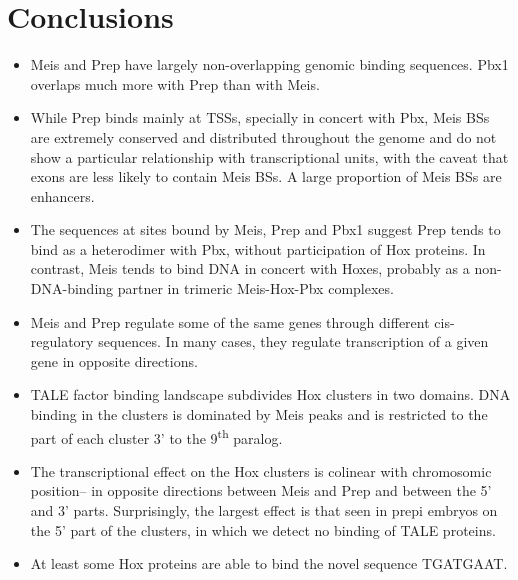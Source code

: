 \chapter{Conclusions}
\label{chp:conclusions}

\begin{itemize}

  \item Meis and Prep have largely non-overlapping genomic binding sequences. Pbx1 overlaps much more with Prep than with Meis. 
  
  \item While Prep binds mainly at \acp{TSS}, specially in concert with Pbx, Meis \acp{BS} are extremely conserved and distributed throughout the genome and do not show a particular relationship with transcriptional units, with the caveat that exons are less likely to contain Meis \acp{BS}. A large proportion of Meis \acp{BS} are enhancers. 
  
  \item The sequences at sites bound by Meis, Prep and Pbx1 suggest Prep tends to bind as a heterodimer with Pbx, without participation of Hox proteins. In contrast, Meis tends to bind DNA in concert with Hoxes, probably as a non-DNA-binding partner in trimeric Meis-Hox-Pbx complexes.
    
  \item Meis and Prep regulate some of the same genes through different cis-regulatory sequences. In many cases, they regulate transcription of a given gene in opposite directions.  
  
  \item TALE factor binding landscape subdivides Hox clusters in two domains. DNA binding in the clusters is dominated by Meis peaks and is restricted to the part of each cluster 3' to the 9\textsuperscript{th} paralog.
  
  \item The transcriptional effect on the Hox clusters is colinear with chromosomic position-- in opposite directions between Meis and Prep and between the 5' and 3' parts. Surprisingly, the largest effect is that seen in \ac{prepi} embryos on the 5' part of the clusters, in which we detect no binding of \ac{TALE} proteins.
   
  \item At least some Hox proteins are able to bind the novel sequence TGATGAAT.

\end{itemize}

